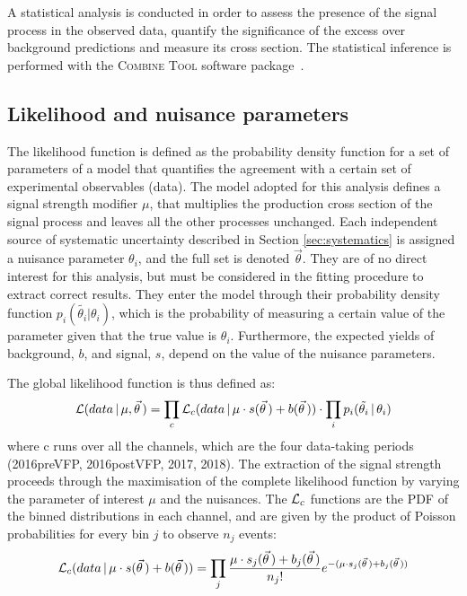 \label{sec:statistical_analysis}
A statistical analysis is conducted in order to assess the presence of the signal process in the observed data,
quantify the significance of the excess over background predictions and measure its cross section.
The statistical inference is performed with the \textsc{Combine Tool} software package~\cite{CMS-NOTE-2011-005}.

\subsection{Likelihood and nuisance parameters}
The likelihood function is defined as the probability density function for a set of parameters of a model
that quantifies the agreement with a certain set of experimental observables (data).
The model adopted for this analysis defines a signal strength modifier $\mu$,
that multiplies the production cross section of the signal process and leaves all the other processes unchanged.
Each independent source of systematic uncertainty described in Section \ref{sec:systematics} is assigned a nuisance parameter $\theta_i$, and the full set is denoted $\vec\theta$.
They are of no direct interest for this analysis, but must be considered in the fitting procedure to extract correct results.
They enter the model through their probability density function $p_i(\tilde{\theta_i}|\theta_i)$,
which is the probability of measuring a certain value of the parameter given that the true value is $\theta_i$.
Furthermore, the expected yields of background, $b$, and signal, $s$, depend on the value of the nuisance parameters.

The global likelihood function is thus defined as:
\begin{equation}
  \label{eq:likelihood_full}
  \mathcal{L}(data\, |\, \mu, \vec\theta\,) = \prod_c \mathcal{L}_c(data\, |\, \mu \cdot s(\vec\theta\,) + b(\vec\theta\,)) \cdot \prod_i p_i(\tilde{\theta_i}\, |\, \theta_i)
\end{equation}
where c runs over all the channels, which are the four data-taking periods (2016preVFP, 2016postVFP, 2017, 2018).
The extraction of the signal strength proceeds through the maximisation of the complete likelihood function by varying the parameter of interest $\mu$ and the nuisances.
The $\mathcal{L}_c$ functions are the PDF of the binned distributions in each channel, and are given by the product of Poisson probabilities for every bin $j$ to observe $n_j$ events:
\begin{equation}
  \label{eq:likelihood_bin}
  \mathcal{L}_c(data\, |\, \mu \cdot s(\vec\theta\,) + b(\vec\theta\,)) = \prod_j \frac{\mu \cdot s_j(\vec\theta\,) + b_j(\vec\theta\,)}{n_j!} e^{-(\mu \cdot s_j(\vec\theta\,) + b_j(\vec\theta\,))}
\end{equation}


